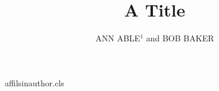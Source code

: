 \begin{filecontents*}[overwrite]{affilsinauthor.cls}
\def\affilfont{\small}
\def\author#1{\gdef\@author{#1}}
\def\affil#1{\gdef\@affil{#1}\ifx\@affil\@empty\else{\reset@font\affilfont\unskip,\ #1\vphantom{gy}\endgraf}\fi}\affil{}
\def\maketitle{\par{\Large\@title\par}{\noindent\@author\par}}
\end{filecontents*}
\documentclass{affilsinauthor}

\title{A Title}
\author{ANN ABLE$^1$ and BOB BAKER  }
\maketitle
Body.

